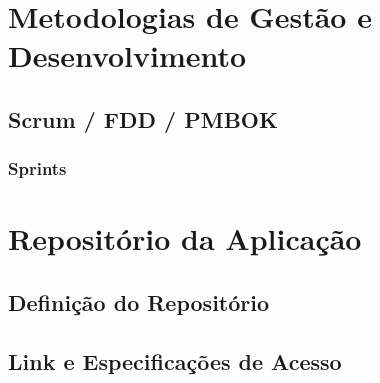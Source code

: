 \section{Metodologias de Gestão e Desenvolvimento}
\subsection{Scrum / FDD / PMBOK}
\subsubsection{Sprints}
\section{Repositório da Aplicação}
\subsection{Definição do Repositório}
\subsection{Link e Especificações de Acesso}